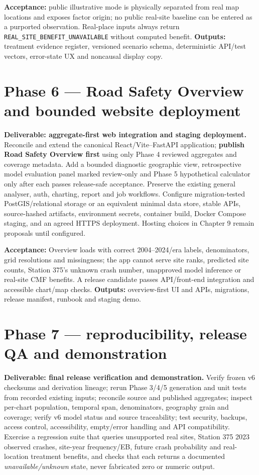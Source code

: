 \documentclass[11pt,a4paper,openany]{report}
\newcommand{\pathcode}[1]{\nolinkurl{#1}}
\begin{document}
\textbf{Acceptance:} public illustrative mode is physically separated from real map locations and exposes factor origin; no public real-site baseline can be entered as a purported observation. Real-place inputs always return \pathcode{REAL_SITE_BENEFIT_UNAVAILABLE} without computed benefit. \textbf{Outputs:} treatment evidence register, versioned scenario schema, deterministic API/test vectors, error-state UX and noncausal display copy.

\section{Phase 6 --- Road Safety Overview and bounded website deployment}
\textbf{Deliverable: aggregate-first web integration and staging deployment.} Reconcile and extend the canonical React/Vite--FastAPI application; \textbf{publish Road Safety Overview first} using only Phase 4 reviewed aggregates and coverage metadata. Add a bounded diagnostic geographic view, retrospective model evaluation panel marked review-only and Phase 5 hypothetical calculator only after each passes release-safe acceptance. Preserve the existing general analyser, auth, charting, report and job workflows. Configure migration-tested PostGIS/relational storage or an equivalent minimal data store, stable APIs, source-hashed artifacts, environment secrets, container build, Docker Compose staging, and an agreed HTTPS deployment. Hosting choices in Chapter 9 remain proposals until configured.

\textbf{Acceptance:} Overview loads with correct 2004--2024/era labels, denominators, grid resolutions and missingness; the app cannot serve site ranks, predicted site counts, Station 375's unknown crash number, unapproved model inference or real-site CMF benefits. A release candidate passes API/front-end integration and accessible chart/map checks. \textbf{Outputs:} overview-first UI and APIs, migrations, release manifest, runbook and staging demo.

\section{Phase 7 --- reproducibility, release QA and demonstration}
\textbf{Deliverable: final release verification and demonstration.} Verify frozen v6 checksums and derivation lineage; rerun Phase 3/4/5 generation and unit tests from recorded existing inputs; reconcile source and published aggregates; inspect per-chart population, temporal span, denominators, geography grain and coverage; verify v6 model status and source traceability; test security, backups, access control, accessibility, empty/error handling and API compatibility. Exercise a regression suite that queries unsupported real sites, Station 375 2023 observed crashes, site-year frequency/EB, future crash probability and real-location treatment benefits, and checks that each returns a documented \emph{unavailable/unknown} state, never fabricated zero or numeric output.
\end{document}
